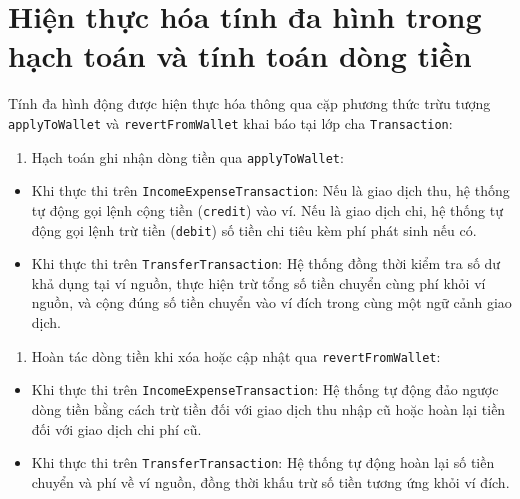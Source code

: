 \documentclass[a4paper,12pt]{report}
\providecommand{\tightlist}{%
  \setlength{\itemsep}{0pt}\setlength{\parskip}{0pt}}
\newcommand{\passthrough}[1]{#1}
\begin{document}
\section{Hiện thực hóa tính đa hình trong hạch toán và tính toán dòng
tiền}\label{hiux1ec7n-thux1ef1c-huxf3a-tuxednh-ux111a-huxecnh-trong-hux1ea1ch-touxe1n-vuxe0-tuxednh-touxe1n-duxf2ng-tiux1ec1n}

Tính đa hình động được hiện thực hóa thông qua cặp phương thức trừu
tượng \passthrough{\lstinline!applyToWallet!} và
\passthrough{\lstinline!revertFromWallet!} khai báo tại lớp cha
\passthrough{\lstinline!Transaction!}:

\begin{enumerate}
\def\labelenumi{\arabic{enumi}.}
\tightlist
\item
  Hạch toán ghi nhận dòng tiền qua
  \passthrough{\lstinline!applyToWallet!}:
\end{enumerate}

\begin{itemize}
\tightlist
\item
  Khi thực thi trên \passthrough{\lstinline!IncomeExpenseTransaction!}:
  Nếu là giao dịch thu, hệ thống tự động gọi lệnh cộng tiền
  (\passthrough{\lstinline!credit!}) vào ví. Nếu là giao dịch chi, hệ
  thống tự động gọi lệnh trừ tiền (\passthrough{\lstinline!debit!}) số
  tiền chi tiêu kèm phí phát sinh nếu có.
\item
  Khi thực thi trên \passthrough{\lstinline!TransferTransaction!}: Hệ
  thống đồng thời kiểm tra số dư khả dụng tại ví nguồn, thực hiện trừ
  tổng số tiền chuyển cùng phí khỏi ví nguồn, và cộng đúng số tiền
  chuyển vào ví đích trong cùng một ngữ cảnh giao dịch.
\end{itemize}

\begin{enumerate}
\def\labelenumi{\arabic{enumi}.}
\setcounter{enumi}{1}
\tightlist
\item
  Hoàn tác dòng tiền khi xóa hoặc cập nhật qua
  \passthrough{\lstinline!revertFromWallet!}:
\end{enumerate}

\begin{itemize}
\tightlist
\item
  Khi thực thi trên \passthrough{\lstinline!IncomeExpenseTransaction!}:
  Hệ thống tự động đảo ngược dòng tiền bằng cách trừ tiền đối với giao
  dịch thu nhập cũ hoặc hoàn lại tiền đối với giao dịch chi phí cũ.
\item
  Khi thực thi trên \passthrough{\lstinline!TransferTransaction!}: Hệ
  thống tự động hoàn lại số tiền chuyển và phí về ví nguồn, đồng thời
  khấu trừ số tiền tương ứng khỏi ví đích.
\end{itemize}
\end{document}
